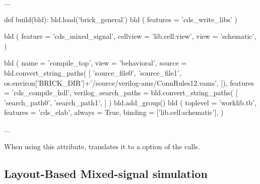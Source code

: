 \begin{lstwscript}
...

def build(bld):
    bld.load('brick_general')
    bld ( features = 'cds_write_libs' )

    bld (
        feature = 'cds_mixed_signal',
        cellview = 'lib.cell:view',
        view = 'schematic',
    )

    bld (
        name = 'compile_top',
        view = 'behavioral',
        source = bld.convert_string_paths(
            [
                'source_file0',
                'source_file1',
                os.environ['BRICK_DIR']+'/source/verilog-ams/ConnRules12.vams',
            ]),
        features = 'cds_compile_hdl',
        verilog_search_paths = bld.convert_string_paths(
            [
                'search_path0',
                'search_path1',
            ]
    )
    bld.add_group()
    bld (
        toplevel = 'worklib.tb',
        features = 'cds_elab',
        always = True,
        binding = ['lib.cell:schematic'],
    )

...
\end{lstwscript}

When using this attribute,  translates it to a  option of
the  calls.

\subsection{Layout-Based Mixed-signal simulation}

%
%
%
%
%
%

